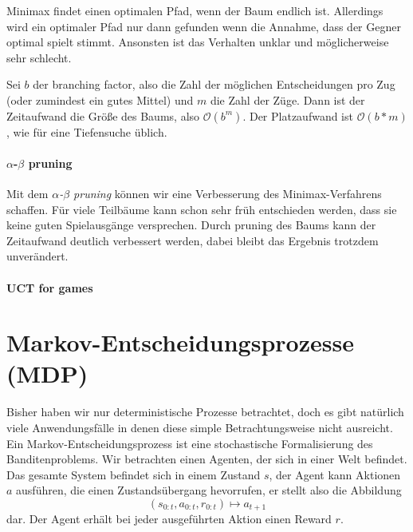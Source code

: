 \documentclass[ngerman]{../LaTeX-Templates/Paper/paper}
\begin{document}
Minimax findet einen optimalen Pfad, wenn der Baum endlich ist.
Allerdings wird ein optimaler Pfad nur dann gefunden wenn die Annahme, dass der Gegner optimal spielt stimmt. Ansonsten ist das Verhalten unklar und möglicherweise sehr schlecht.

Sei $b$ der branching factor, also die Zahl der möglichen Entscheidungen pro Zug (oder zumindest ein gutes Mittel) und $m$ die Zahl der Züge. Dann ist der Zeitaufwand die Größe des Baums, also $\mathcal O(b^m)$. Der Platzaufwand ist $\mathcal O(b*m)$, wie für eine Tiefensuche üblich.

\paragraph{$\alpha$-$\beta$ pruning}
Mit dem \emph{$\alpha$-$\beta$ pruning} können wir eine Verbesserung des Minimax-Verfahrens schaffen. 
Für viele Teilbäume kann schon sehr früh entschieden werden, dass sie keine guten Spielausgänge versprechen. Durch pruning des Baums kann der Zeitaufwand deutlich verbessert werden, dabei bleibt das Ergebnis trotzdem unverändert.



\paragraph{UCT for games}







\section{Markov-Entscheidungsprozesse (MDP)}
Bisher haben wir nur deterministische Prozesse betrachtet, doch es gibt natürlich viele Anwendungsfälle in denen diese simple Betrachtungsweise nicht ausreicht.
Ein Markov-Entscheidungsprozess ist eine stochastische Formalisierung des Banditenproblems. Wir betrachten einen Agenten, der sich in einer Welt befindet. Das gesamte System befindet sich in einem Zustand $s$, der Agent kann Aktionen $a$ ausführen, die einen Zustandsübergang hevorrufen, er stellt also die Abbildung
\begin{equation*}
	(s_{0:t},a_{0:t},r_{0:t})\mapsto a_{t+1}
\end{equation*}
dar.
Der Agent erhält bei jeder ausgeführten Aktion einen Reward $r$.
\end{document}
